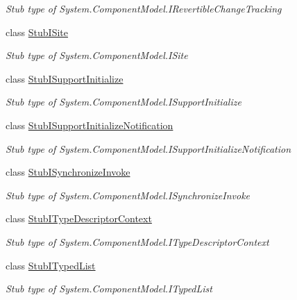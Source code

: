 \begin{DoxyCompactItemize}
\begin{DoxyCompactList}\small\item\em Stub type of System.\-Component\-Model.\-I\-Revertible\-Change\-Tracking\end{DoxyCompactList}\item 
class \hyperlink{class_system_1_1_component_model_1_1_fakes_1_1_stub_i_site}{Stub\-I\-Site}
\begin{DoxyCompactList}\small\item\em Stub type of System.\-Component\-Model.\-I\-Site\end{DoxyCompactList}\item 
class \hyperlink{class_system_1_1_component_model_1_1_fakes_1_1_stub_i_support_initialize}{Stub\-I\-Support\-Initialize}
\begin{DoxyCompactList}\small\item\em Stub type of System.\-Component\-Model.\-I\-Support\-Initialize\end{DoxyCompactList}\item 
class \hyperlink{class_system_1_1_component_model_1_1_fakes_1_1_stub_i_support_initialize_notification}{Stub\-I\-Support\-Initialize\-Notification}
\begin{DoxyCompactList}\small\item\em Stub type of System.\-Component\-Model.\-I\-Support\-Initialize\-Notification\end{DoxyCompactList}\item 
class \hyperlink{class_system_1_1_component_model_1_1_fakes_1_1_stub_i_synchronize_invoke}{Stub\-I\-Synchronize\-Invoke}
\begin{DoxyCompactList}\small\item\em Stub type of System.\-Component\-Model.\-I\-Synchronize\-Invoke\end{DoxyCompactList}\item 
class \hyperlink{class_system_1_1_component_model_1_1_fakes_1_1_stub_i_type_descriptor_context}{Stub\-I\-Type\-Descriptor\-Context}
\begin{DoxyCompactList}\small\item\em Stub type of System.\-Component\-Model.\-I\-Type\-Descriptor\-Context\end{DoxyCompactList}\item 
class \hyperlink{class_system_1_1_component_model_1_1_fakes_1_1_stub_i_typed_list}{Stub\-I\-Typed\-List}
\begin{DoxyCompactList}\small\item\em Stub type of System.\-Component\-Model.\-I\-Typed\-List\end{DoxyCompactList}\item 

\end{DoxyCompactItemize}
